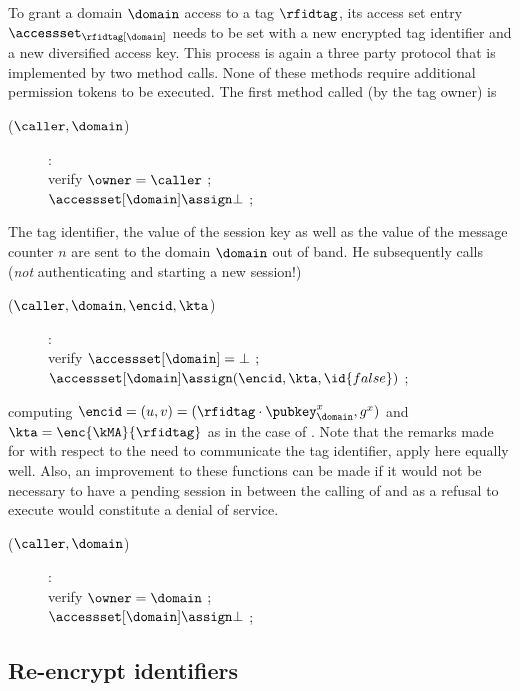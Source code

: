 To grant a domain $\domain$ access to a tag $\rfidtag$, its access set entry
$\accessset_\rfidtag[\domain]$ needs to be set with 
a new encrypted tag identifier and a new diversified access key.
This process is again a three party protocol that is implemented by two method calls. 
None of these methods require additional permission tokens to be executed.
The first method called (by the tag owner) is
\begin{description}
\item[($\caller,\domain$)]:\\
	verify $\owner = \caller$ ; \\
	$\accessset[\domain] \assign \bot$ ; 
\end{description}
The tag identifier, the value of the session key as well as the value of the message counter $n$
are sent to the domain $\domain$ out of band.
He subsequently calls (\emph{not} authenticating and starting a new session!)
\begin{description}
\item[($\caller,\domain,\encid,\kta$)]:\\
	verify $\accessset[\domain] = \bot$ ; \\
	$\accessset[\domain] \assign (\encid,\kta, \id{false})$  ;
\end{description}
computing
$\encid = (u,v) = (\rfidtag \cdot \pubkey_{\domain}^x,g^x)$
and 
$\kta = \enc{\kMA}{\rfidtag}$ 
as in the case of .
Note that the remarks made for  with respect to 
the need to communicate the tag identifier, apply here equally well.
Also, an improvement to these functions can be made if it would not be
necessary to have a pending session in between the calling of  
and  as a refusal to execute  
would constitute a denial of service.
\begin{description}
\item[($\caller,\domain$)]:\\
	verify $\owner = \domain$ ; \\
	$\accessset[\domain] \assign \bot$ ; 
\end{description}

\subsection{Re-encrypt identifiers}
\label{ssec-reencrypt-method}

